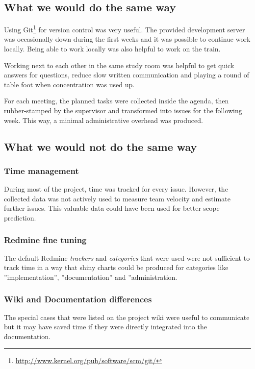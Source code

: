 \subsection{What we would do the same way}

Using Git\footnote{\url{http://www.kernel.org/pub/software/scm/git/}} for version 
control was very useful. The provided development server was occasionally down 
during the first weeks and it was possible to continue work locally. Being able 
to work locally was also helpful to work on the train. 

Working next to each other in the same study room was helpful to get quick 
answers for questions, reduce slow written communication and playing a round of 
table foot when concentration was used up.

For each meeting, the planned tasks were collected inside the agenda, then 
rubber-stamped by the supervisor and transformed into issues for the following 
week. This way, a minimal administrative overhead was produced.

\subsection{What we would not do the same way}

\subsubsection{Time management}
During most of the project, time was tracked for every issue. 
However, the collected data was not actively used to measure team velocity and 
estimate further issues. This valuable data could have been used for better 
scope prediction.

\subsubsection{Redmine fine tuning}
The default Redmine \textit{trackers} and \textit{categories} that were used 
were not sufficient to track time in a way that shiny charts could be produced 
for categories like ''implementation'', ''documentation'' and ''administration. 

\subsubsection{Wiki and Documentation differences}
The special cases that were listed on the project wiki were useful to 
communicate but it may have saved time if they were directly integrated into 
the documentation.

